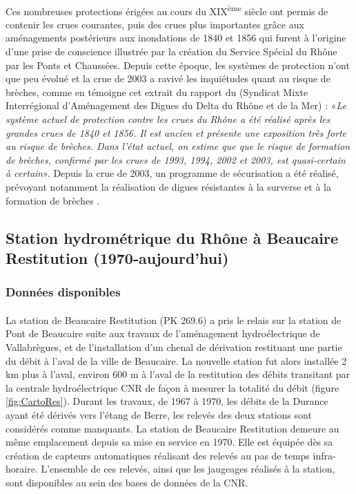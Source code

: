 	\paragraph{} Ces nombreuses protections érigées au cours du XIX\textsuperscript{ème} siècle ont permis de contenir les crues courantes, puis des crues plus importantes grâce aux aménagements postérieurs aux inondations de 1840 et 1856 qui furent à l'origine d'une prise de conscience illustrée par la création du Service Spécial du Rhône par les Ponts et Chaussées. Depuis cette époque, les systèmes de protection n'ont que peu évolué et la crue de 2003 a ravivé les inquiétudes quant au risque de brèches, comme en témoigne cet extrait du rapport du \citet{symadrem_programme_2012} (Syndicat Mixte Interrégional d'Aménagement des Digues du Delta du Rhône et de la Mer) : «\textit{Le système actuel de protection contre les crues du Rhône a été réalisé après les grandes crues de 1840 et 1856. Il est ancien et présente une exposition très forte au risque de brèches. Dans l'état actuel, on estime que que le risque de formation de brèches, confirmé par les crues de 1993, 1994, 2002 et 2003, est quasi-certain à certain}». Depuis la crue de 2003, un programme de sécurisation a été réalisé, prévoyant notamment la réalisation de digues résistantes à la surverse et à la formation de brèches \citep{symadrem_programme_2012}.    
		

\FloatBarrier
	\subsection{Station hydrométrique du Rhône à Beaucaire Restitution (1970-aujourd'hui)}
	
	\subsubsection{Données disponibles}

	\paragraph{} La station de Beaucaire Restitution (PK 269.6) a pris le relais sur la station de Pont de Beaucaire suite aux travaux de l'aménagement hydroélectrique de Vallabrègues, et de l'installation d'un chenal de dérivation restituant une partie du débit à l'aval de la ville de Beaucaire. La nouvelle station fut alors installée 2 km plus à l'aval, environ 600 m à l'aval de la restitution des débits transitant par la centrale hydroélectrique CNR de façon à mesurer la totalité du débit (figure \ref{fig:CartoRes}). Durant les travaux, de 1967 à 1970, les débits de la Durance ayant été dérivés vers l'étang de Berre, les relevés des deux stations sont considérés comme manquants. La station de Beaucaire Restitution demeure au même emplacement depuis sa mise en service en 1970. Elle est équipée dès sa création de capteurs automatiques réalisant des relevés au pas de temps infra-horaire. L'ensemble de ces relevés, ainsi que les jaugeages réalisés à la station, sont disponibles au sein des bases de données de la CNR.
		
